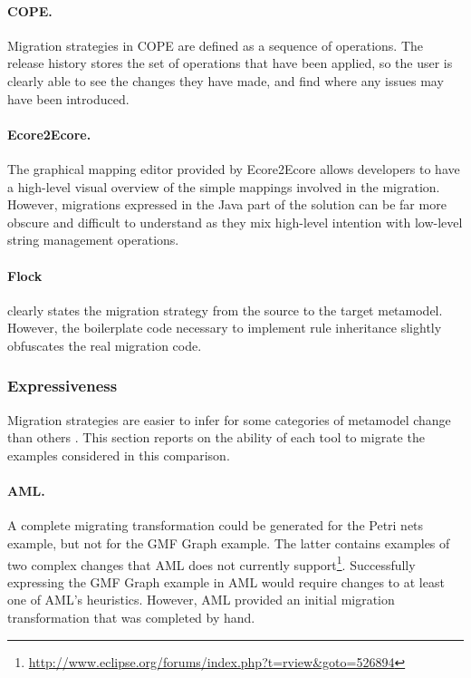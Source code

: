 \paragraph{COPE.} Migration strategies in COPE are defined as a sequence of operations. The release history stores the set of operations that have been applied, so the user is clearly able to see the changes they have made, and find where any issues may have been introduced.

\paragraph{Ecore2Ecore.} The graphical mapping editor provided by Ecore2Ecore allows developers to have a high-level visual overview of the simple mappings involved in the migration. However, migrations expressed in the Java part of the solution can be far more obscure and difficult to understand as they mix high-level intention with low-level string management operations.

\paragraph{Flock} clearly states the migration strategy from the source to the target metamodel.
However, the boilerplate code necessary to implement rule inheritance slightly obfuscates the real migration code.



\subsubsection{Expressiveness}
Migration strategies are easier to infer for some categories of metamodel change than others \cite{gruschko07towards}. This section reports on the ability of each tool to migrate the examples considered in this comparison.

\paragraph{AML.} A complete migrating transformation could be generated for the Petri nets example, but not for the GMF Graph example. The latter contains examples of two complex changes that AML does not currently support\footnote{\url{http://www.eclipse.org/forums/index.php?t=rview&goto=526894}}. Successfully expressing the GMF Graph example in AML would require changes to at least one of AML's heuristics. However, AML provided an initial migration transformation that was completed by hand.

